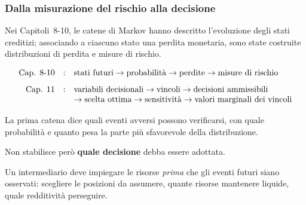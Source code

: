 \begin{frame}%
%

\frametitle{Dalla misurazione del rischio alla decisione}%
%

%


Nei Capitoli~8-10, le catene di Markov hanno descritto l'evoluzione degli
stati creditizi; associando a ciascuno stato una perdita monetaria, sono state
costruite distribuzioni di perdita e misure di rischio.

\medskip

{\small
\[%
\begin{array}
[c]{rcl}%
\mbox{Cap. 8-10} & : & \mbox{stati futuri}\rightarrow
\mbox{probabilit\`a}\rightarrow\mbox{perdite}\rightarrow
\mbox{misure di rischio}\\[8pt]%
\mbox{Cap. 11} & : & \mbox{variabili decisionali}\rightarrow
\mbox{vincoli}\rightarrow\mbox{decisioni ammissibili}\\
&  & \rightarrow\mbox{scelta ottima}\rightarrow\mbox{sensitivit\`a}\rightarrow
\mbox{valori marginali dei vincoli}
\end{array}
\]
}

\medskip

\begin{stepitemize}
\item La prima catena dice quali eventi avversi possono verificarsi, con quale
probabilit\`{a} e quanto pesa la parte pi\`{u} sfavorevole della distribuzione.

\item Non stabilisce per\`{o} \textbf{quale decisione} debba essere adottata.

\item Un intermediario deve impiegare le risorse \emph{prima} che gli eventi
futuri siano osservati: scegliere le posizioni da assumere, quante risorse
mantenere liquide, quale redditivit\`{a} perseguire.
\end{stepitemize}

%

\transboxout
\end{frame}%


